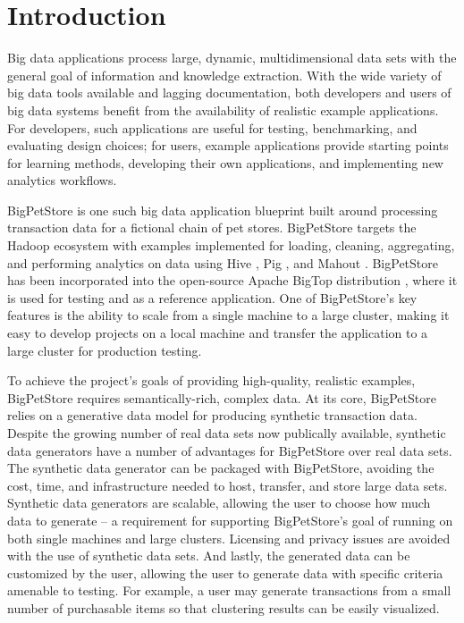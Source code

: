 \section{Introduction}
Big data applications process large, dynamic, multidimensional data sets with the general goal of information and knowledge extraction.  With the wide variety of big data tools available and lagging documentation, both developers and users of big data systems benefit from the availability of realistic example applications.  For developers, such applications are useful for testing, benchmarking, and evaluating design choices; for users, example applications provide starting points for learning methods, developing their own applications, and implementing new analytics workflows.

BigPetStore is one such big data application blueprint built around processing transaction data for a fictional chain of pet stores.  BigPetStore targets the Hadoop \cite{Hadoop} ecosystem with examples implemented for loading, cleaning, aggregating, and performing analytics on data using Hive \cite{Thusoo2010}, Pig \cite{Olston2008,Gates2009}, and Mahout \cite{Mahout}. BigPetStore has been incorporated into the open-source Apache BigTop distribution \cite{BigTop}, where it is used for testing and as a reference application. One of BigPetStore's key features is the ability to scale from a single machine to a large cluster, making it easy to develop projects on a local machine and transfer the application to a large cluster for production testing.

To achieve the project's goals of providing high-quality, realistic examples, BigPetStore requires semantically-rich, complex data. At its core, BigPetStore relies on a generative data model for producing synthetic transaction data. Despite the growing number of real data sets now publically available, synthetic data generators have a number of advantages for BigPetStore over real data sets. The synthetic data generator can be packaged with BigPetStore, avoiding the cost, time, and infrastructure needed to host, transfer, and store large data sets. Synthetic data generators are scalable, allowing the user to choose how much data to generate -- a requirement for supporting BigPetStore's goal of running on both single machines and large clusters.  Licensing and privacy issues are avoided with the use of synthetic data sets. And lastly, the generated data can be customized by the user, allowing the user to generate data with specific criteria amenable to testing.  For example, a user may generate transactions from a small number of purchasable items so that clustering results can be easily visualized.

